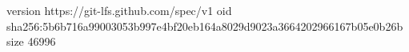 version https://git-lfs.github.com/spec/v1
oid sha256:5b6b716a99003053b997e4bf20eb164a8029d9023a3664202966167b05e0b26b
size 46996
